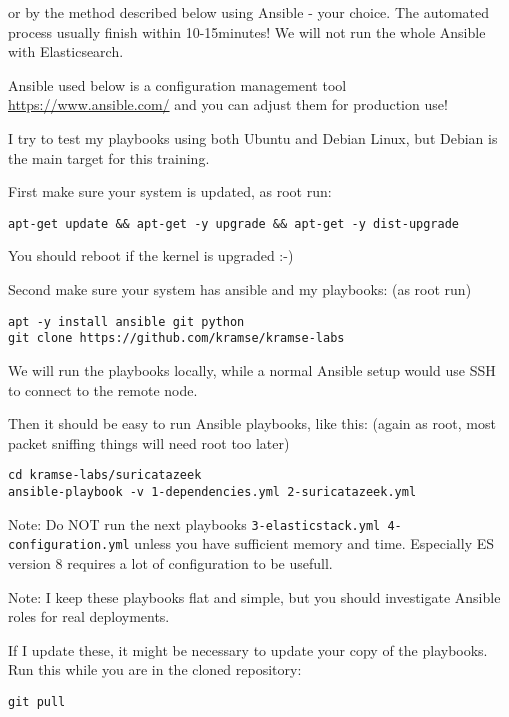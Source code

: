 \documentclass[a4paper,11pt,notitlepage]{report}
\begin{document}
or by the method described below using Ansible - your choice. The automated process usually finish within 10-15minutes! We will not run the whole Ansible with Elasticsearch.

Ansible used below is a configuration management tool \url{https://www.ansible.com/} and you can adjust them for production use!

I try to test my playbooks using both Ubuntu and Debian Linux, but Debian is the main target for this training.

First make sure your system is updated, as root run:

\begin{verbatim}
apt-get update && apt-get -y upgrade && apt-get -y dist-upgrade
\end{verbatim}

You should reboot if the kernel is upgraded :-)

Second make sure your system has ansible and my playbooks: (as root run)
\begin{verbatim}
apt -y install ansible git python
git clone https://github.com/kramse/kramse-labs
\end{verbatim}

We will run the playbooks locally, while a normal Ansible setup would use SSH to connect to the remote node.

Then it should be easy to run Ansible playbooks, like this: (again as root, most packet sniffing things will need root too later)

\begin{verbatim}
cd kramse-labs/suricatazeek
ansible-playbook -v 1-dependencies.yml 2-suricatazeek.yml
\end{verbatim}

Note: Do NOT run the next playbooks \verb+3-elasticstack.yml 4-configuration.yml+ unless you have sufficient memory and time. Especially ES version 8 requires a lot of configuration to be usefull.

Note: I keep these playbooks flat and simple, but you should investigate Ansible roles for real deployments.

If I update these, it might be necessary to update your copy of the playbooks. Run this while you are in the cloned repository:

\begin{verbatim}
git pull
\end{verbatim}
\end{document}
